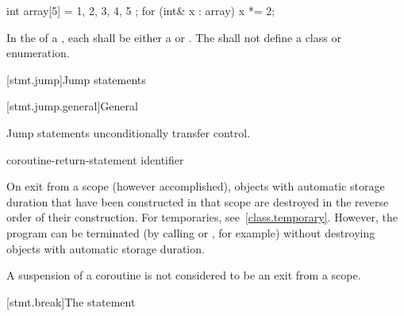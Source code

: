 \begin{example}
\begin{codeblock}
int array[5] = { 1, 2, 3, 4, 5 };
for (int& x : array)
  x *= 2;
\end{codeblock}
\end{example}

\pnum
In the  of a ,
each  shall be either a 
or . The  shall not define a
class or enumeration.%

[stmt.jump]{Jump statements}%

[stmt.jump.general]{General}%

\pnum
Jump statements unconditionally transfer control.
%

%
%
%
%
%
%
\begin{bnf}
\br
     \terminal{;}\br
     \terminal{;}\br
      \terminal{;}\br
    coroutine-return-statement\br
     identifier \terminal{;}
\end{bnf}

\pnum
{}%
%
\begin{note}
On exit from a scope (however accomplished), objects with automatic storage
duration that have been constructed in that scope are destroyed
in the reverse order of their construction.
For temporaries, see~\ref{class.temporary}.
However, the program can be terminated (by calling
%
%
 or
%
%
, for example) without
destroying objects with automatic storage duration.
\end{note}
\begin{note}
A suspension of a coroutine is not considered to be an exit from a scope.
\end{note}

[stmt.break]{The  statement}%

